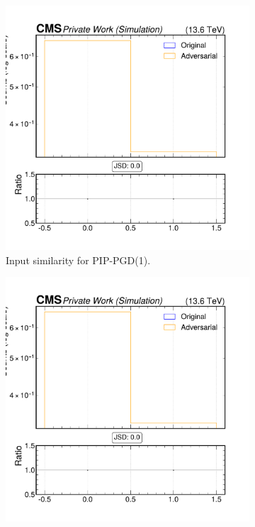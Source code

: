 \begin{figure}[h]
  \centering
  \begin{subfigure}[t]{0.32\textwidth}
    \includegraphics[width=\linewidth]{media/output/features/compare/combined_it_1/cmp_cpf_arr_Cpfcan_puppiw.pdf}
    \caption*{Input similarity for PIP-PGD(1).}
  \end{subfigure}\hfill
  \begin{subfigure}[t]{0.32\textwidth}
    \includegraphics[width=\linewidth]{media/output/features/compare/combined_it_2/cmp_cpf_arr_Cpfcan_puppiw.pdf}

\end{subfigure}
\end{figure}
